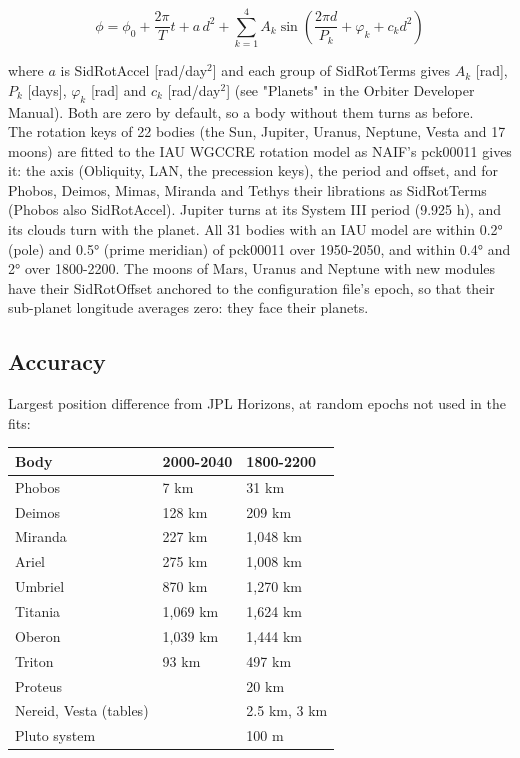 \documentclass[Orbiter Technical Reference.tex]{subfiles}
\begin{document}
\begin{sloppypar}
\[ \phi = \phi_{0} + \frac{2\pi}{T} t + a\, d^{2} + \sum_{k=1}^{4} A_{k} \sin\left(\frac{2\pi d}{P_{k}} + \varphi_{k} + c_{k} d^{2}\right) \]

\noindent
where $a$ is SidRotAccel [rad/day$^{2}$] and each group of SidRotTerms gives $A_{k}$ [rad], $P_{k}$ [days], $\varphi_{k}$ [rad] and $c_{k}$ [rad/day$^{2}$] (see "Planets" in the Orbiter Developer Manual). Both are zero by default, so a body without them turns as before.\\
The rotation keys of 22 bodies (the Sun, Jupiter, Uranus, Neptune, Vesta and 17 moons) are fitted to the IAU WGCCRE rotation model as NAIF's pck00011 gives it: the axis (Obliquity, LAN, the precession keys), the period and offset, and for Phobos, Deimos, Mimas, Miranda and Tethys their librations as SidRotTerms (Phobos also SidRotAccel). Jupiter turns at its System III period (9.925 h), and its clouds turn with the planet. All 31 bodies with an IAU model are within 0.2° (pole) and 0.5° (prime meridian) of pck00011 over 1950-2050, and within 0.4° and 2° over 1800-2200. The moons of Mars, Uranus and Neptune with new modules have their SidRotOffset anchored to the configuration file's epoch, so that their sub-planet longitude averages zero: they face their planets.


\subsection{Accuracy}
Largest position difference from JPL Horizons, at random epochs not used in the fits:

	\begin{longtable}{ |p{}|p{}|p{}| }
	\hline\rule{0pt}{2ex}
	\textbf{Body} & \textbf{2000-2040} & \textbf{1800-2200}\\
	\hline\rule{0pt}{2ex}
	Phobos & 7 km & 31 km\\
	\hline\rule{0pt}{2ex}
	Deimos & 128 km & 209 km\\
	\hline\rule{0pt}{2ex}
	Miranda & 227 km & 1,048 km\\
	\hline\rule{0pt}{2ex}
	Ariel & 275 km & 1,008 km\\
	\hline\rule{0pt}{2ex}
	Umbriel & 870 km & 1,270 km\\
	\hline\rule{0pt}{2ex}
	Titania & 1,069 km & 1,624 km\\
	\hline\rule{0pt}{2ex}
	Oberon & 1,039 km & 1,444 km\\
	\hline\rule{0pt}{2ex}
	Triton & 93 km & 497 km\\
	\hline\rule{0pt}{2ex}
	Proteus & & 20 km\\
	\hline\rule{0pt}{2ex}
	Nereid, Vesta (tables) & & 2.5 km, 3 km\\
	\hline\rule{0pt}{2ex}
	Pluto system & & 100 m\\
	\hline
	\end{longtable}

\end{sloppypar}
\end{document}
